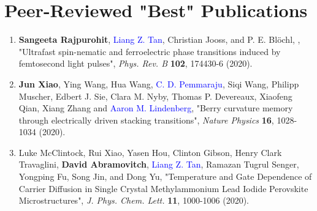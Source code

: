\section{Peer-Reviewed "Best" Publications}

\begin{enumerate}
    \item  {\bf Sangeeta Rajpurohit}, \textcolor{blue}{Liang Z. Tan},  Christian Jooss, and P. E. Bl\"ochl, , "Ultrafast spin-nematic and ferroelectric phase transitions induced by femtosecond light pulses", {\it Phys. Rev. B} {\bf 102}, 174430-6 (2020). 

    
    \item {\bf Jun Xiao}, Ying Wang, Hua Wang, \textcolor{blue}{C. D. Pemmaraju}, Siqi Wang, Philipp Muscher, Edbert J. Sie, Clara M. Nyby, Thomas P. Devereaux, Xiaofeng Qian, Xiang Zhang and \textcolor{blue}{Aaron M. Lindenberg}, "Berry curvature memory through electrically driven stacking transitions", {\it Nature Physics} {\bf 16}, 1028-1034 (2020).

    \item  Luke McClintock, Rui Xiao, Yasen Hou, Clinton Gibson, Henry Clark Travaglini, {\bf David Abramovitch}, \textcolor{blue}{Liang Z. Tan}, Ramazan Tugrul Senger, Yongping Fu, Song Jin, and Dong Yu, "Temperature and Gate Dependence of Carrier Diffusion in Single Crystal Methylammonium Lead Iodide Perovskite Microstructures", {\it J. Phys. Chem. Lett.} {\bf 11}, 1000-1006 (2020). 
    
\end{enumerate}

\label{sec:appendix3}

\clearpage
